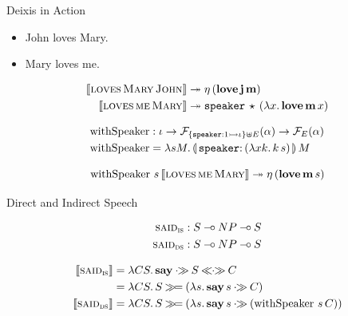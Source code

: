 \documentclass{beamer}
\begin{document}
\begin{frame}{Deixis in Action}

\begin{itemize}
  \item John loves Mary.
  \item Mary loves me.
\end{itemize}

\vfill
\pause

\begin{align*}
  \llbracket \textsc{loves}\,\textsc{Mary}\,\textsc{John} \rrbracket & \twoheadrightarrow 
  \eta\,(\textbf{love}\,\textbf{j}\,\textbf{m}) \\
  \llbracket \textsc{loves}\,\textsc{me}\,\textsc{Mary} \rrbracket & \twoheadrightarrow
  \mathtt{speaker}\,\star\,(\lambda x.\, \textbf{love}\,\textbf{m}\,x)
\end{align*}

\vfill
\pause

\begin{align*}
  \withSpeaker &: \iota \to \FF_{\{\typedop{speaker}{1}{\iota}\} \uplus
    E}(\alpha) \to \FF_E(\alpha) \\
  \withSpeaker &= \lam{s M}{\ap{\banana{\onto{\op{speaker}}{(\lam{x k}{\ap{k}{s}})}}}{M}}
\end{align*}

\pause

$$
  \operatorname{withSpeaker}\,s\,\llbracket \textsc{loves}\,\textsc{me}\,\textsc{Mary} \rrbracket \twoheadrightarrow
  \eta\,(\textbf{love}\,\textbf{m}\,s)
$$

\end{frame}


\begin{frame}{Direct and Indirect Speech}
  
\begin{align*}
  \textsc{said}_{\textsc{is}} &: S \mathbin{{-}\mkern-3.5mu{\circ}} NP \mathbin{{-}\mkern-3.5mu{\circ}} S \\
  \textsc{said}_{\textsc{ds}} &: S \mathbin{{-}\mkern-3.5mu{\circ}} NP \mathbin{{-}\mkern-3.5mu{\circ}} S
\end{align*}

\vfill
\pause

\begin{align*}
  \sem{\abs{said}_{\abs{is}}} &= \lam{C S}{\obj{say} \apr S \aplr C} \\
                             &= \lam{C S}{S \hsbind (\lam{s}{\ap{\obj{say}}{s} \apr C})} \\
  \sem{\abs{said}_{\abs{ds}}} &= \lam{C S}{S \hsbind (\lam{s}{\ap{\obj{say}}{s} \apr (\app{\withSpeaker}{s}{C})})}
\end{align*}

\end{frame}
\end{document}
